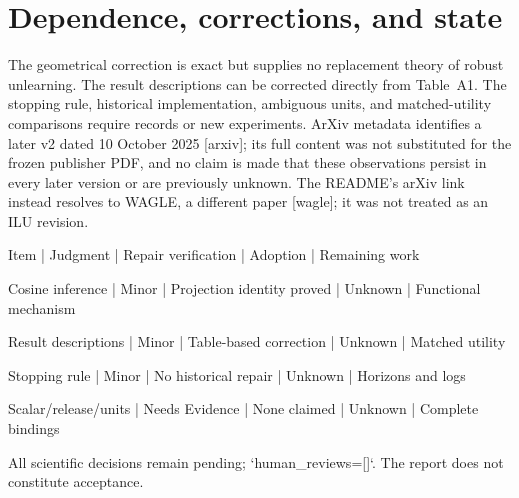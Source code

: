 \documentclass[10pt]{article}
\begin{document}
\section*{Dependence, corrections, and state}
The geometrical correction is exact but supplies no replacement theory of robust unlearning. The result descriptions can be corrected directly from Table A1. The stopping rule, historical implementation, ambiguous units, and matched-utility comparisons require records or new experiments. ArXiv metadata identifies a later v2 dated 10 October 2025 [arxiv]; its full content was not substituted for the frozen publisher PDF, and no claim is made that these observations persist in every later version or are previously unknown. The README’s arXiv link instead resolves to WAGLE, a different paper [wagle]; it was not treated as an ILU revision.\par
Item | Judgment | Repair verification | Adoption | Remaining work\par
Cosine inference | Minor | Projection identity proved | Unknown | Functional mechanism\par
Result descriptions | Minor | Table-based correction | Unknown | Matched utility\par
Stopping rule | Minor | No historical repair | Unknown | Horizons and logs\par
Scalar/release/units | Needs Evidence | None claimed | Unknown | Complete bindings\par
All scientific decisions remain pending; `human\_reviews=[]`. The report does not constitute acceptance.\par
\end{document}
